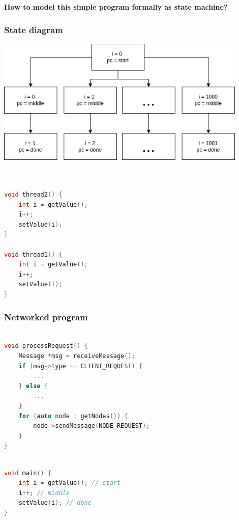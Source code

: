 \documentclass{beamer}
\begin{document}
\begin{frame}
    \begin{center}
        \LARGE{\textbf{How to model this simple program formally as state machine?}}
    \end{center}

\end{frame}

\begin{frame}
    \frametitle{State diagram}
    \includegraphics[width=0.9\textwidth, height=0.9\textheight]{img/1.png}
\end{frame}


\begin{frame}[fragile]
	\begin{lstlisting}[language=C++]


void thread2() {
    int i = getValue();
    i++;
    setValue(i);
}

void thread1() {
    int i = getValue();
    i++;
    setValue(i);
}

	\end{lstlisting}
	
\end{frame}

\begin{frame}[fragile]
    \frametitle{Networked program}
	\begin{lstlisting}[language=C++]

void processRequest() {
    Message *msg = receiveMessage();
    if (msg->type == CLIENT_REQUEST) {
        ...
    } else {
        ...
    }
    for (auto node : getNodes()) {
        node->sendMessage(NODE_REQUEST);
    }
}

	\end{lstlisting}
	
\end{frame}


\begin{frame}[fragile]
	\begin{lstlisting}[language=C++]

void main() {
    int i = getValue(); // start
    i++; // middle
    setValue(i); // done
}

	\end{lstlisting}
	
\end{frame}
\end{document}
